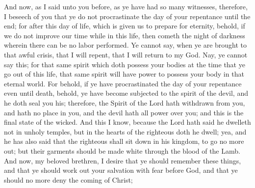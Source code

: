And now, as I said unto you before, as ye have had so many witnesses, therefore, I beseech of you that ye do not procrastinate the day of your repentance until the end; for after this day of life, which is given us to prepare for eternity, behold, if we do not improve our time while in this life, then cometh the night of darkness wherein there can be no labor performed.
\bverse \iffalse Ye cannot say, when ye are brought to that awful crisis, that I will repent, that I will return to my God. Nay, ye cannot say this; for that same spirit which doth possess your bodies at the time that ye go out of this life, that same spirit will have power to possess your body in that eternal world. \fi
Ye cannot say, when ye are brought to that awful crisis, that I will repent, that I will return to my God. Nay, ye cannot say this; for that same spirit which doth possess your bodies at the time that ye go out of this life, that same spirit will have power to possess your body in that eternal world.
\bverse \iffalse For behold, if ye have procrastinated the day of your repentance even until death, behold, ye have become subjected to the spirit of the devil, and he doth seal you his; therefore, the Spirit of the Lord hath withdrawn from you, and hath no place in you, and the devil hath all power over you; and this is the final state of the wicked. \fi
For behold, if ye have procrastinated the day of your repentance even until death, behold, ye have become subjected to the spirit of the devil, and he doth seal you his; therefore, the Spirit of the Lord hath withdrawn from you, and hath no place in you, and the devil hath all power over you; and this is the final state of the wicked.
\bverse \iffalse And this I know, because the Lord hath said he dwelleth not in unholy temples, but in the hearts of the righteous doth he dwell; yea, and he has also said that the righteous shall sit down in his kingdom, to go no more out; but their garments should be made white through the blood of the Lamb. \fi
And this I know, because the Lord hath said he dwelleth not in unholy temples, but in the hearts of the righteous doth he dwell; yea, and he has also said that the righteous shall sit down in his kingdom, to go no more out; but their garments should be made white through the blood of the Lamb.
\bverse \iffalse And now, my beloved brethren, I desire that ye should remember these things, and that ye should work out your salvation with fear before God, and that ye should no more deny the coming of Christ; \fi
And now, my beloved brethren, I desire that ye should remember these things, and that ye should work out your salvation with fear before God, and that ye should no more deny the coming of Christ;
